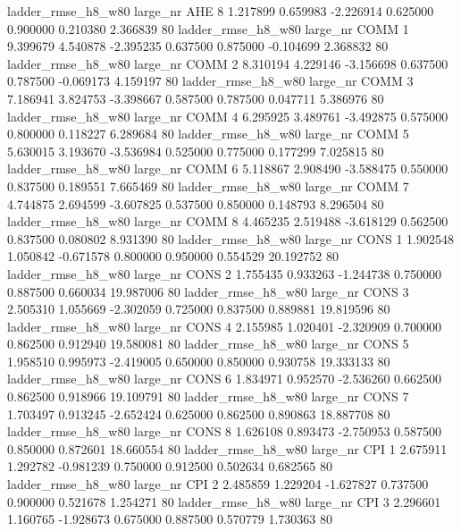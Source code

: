  ladder_rmse_h8_w80   large_nr      AHE                 8  1.217899  0.659983  -2.226914 0.625000 0.900000  0.210380    2.366839 80
 ladder_rmse_h8_w80   large_nr     COMM                 1  9.399679  4.540878  -2.395235 0.637500 0.875000 -0.104699    2.368832 80
 ladder_rmse_h8_w80   large_nr     COMM                 2  8.310194  4.229146  -3.156698 0.637500 0.787500 -0.069173    4.159197 80
 ladder_rmse_h8_w80   large_nr     COMM                 3  7.186941  3.824753  -3.398667 0.587500 0.787500  0.047711    5.386976 80
 ladder_rmse_h8_w80   large_nr     COMM                 4  6.295925  3.489761  -3.492875 0.575000 0.800000  0.118227    6.289684 80
 ladder_rmse_h8_w80   large_nr     COMM                 5  5.630015  3.193670  -3.536984 0.525000 0.775000  0.177299    7.025815 80
 ladder_rmse_h8_w80   large_nr     COMM                 6  5.118867  2.908490  -3.588475 0.550000 0.837500  0.189551    7.665469 80
 ladder_rmse_h8_w80   large_nr     COMM                 7  4.744875  2.694599  -3.607825 0.537500 0.850000  0.148793    8.296504 80
 ladder_rmse_h8_w80   large_nr     COMM                 8  4.465235  2.519488  -3.618129 0.562500 0.837500  0.080802    8.931390 80
 ladder_rmse_h8_w80   large_nr     CONS                 1  1.902548  1.050842  -0.671578 0.800000 0.950000  0.554529   20.192752 80
 ladder_rmse_h8_w80   large_nr     CONS                 2  1.755435  0.933263  -1.244738 0.750000 0.887500  0.660034   19.987006 80
 ladder_rmse_h8_w80   large_nr     CONS                 3  2.505310  1.055669  -2.302059 0.725000 0.837500  0.889881   19.819596 80
 ladder_rmse_h8_w80   large_nr     CONS                 4  2.155985  1.020401  -2.320909 0.700000 0.862500  0.912940   19.580081 80
 ladder_rmse_h8_w80   large_nr     CONS                 5  1.958510  0.995973  -2.419005 0.650000 0.850000  0.930758   19.333133 80
 ladder_rmse_h8_w80   large_nr     CONS                 6  1.834971  0.952570  -2.536260 0.662500 0.862500  0.918966   19.109791 80
 ladder_rmse_h8_w80   large_nr     CONS                 7  1.703497  0.913245  -2.652424 0.625000 0.862500  0.890863   18.887708 80
 ladder_rmse_h8_w80   large_nr     CONS                 8  1.626108  0.893473  -2.750953 0.587500 0.850000  0.872601   18.660554 80
 ladder_rmse_h8_w80   large_nr      CPI                 1  2.675911  1.292782  -0.981239 0.750000 0.912500  0.502634    0.682565 80
 ladder_rmse_h8_w80   large_nr      CPI                 2  2.485859  1.229204  -1.627827 0.737500 0.900000  0.521678    1.254271 80
 ladder_rmse_h8_w80   large_nr      CPI                 3  2.296601  1.160765  -1.928673 0.675000 0.887500  0.570779    1.730363 80
